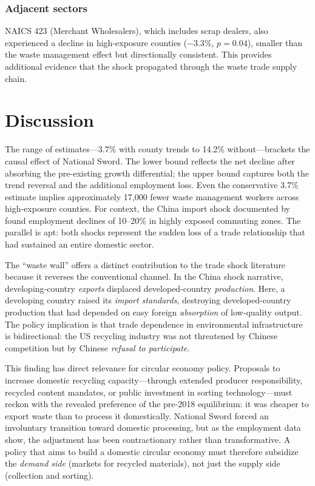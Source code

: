 \documentclass[12pt]{article}
\begin{document}
\subsubsection*{Adjacent sectors} NAICS 423 (Merchant Wholesalers), which includes scrap dealers, also experienced a decline in high-exposure counties ($-3.3\%$, $p = 0.04$), smaller than the waste management effect but directionally consistent. This provides additional evidence that the shock propagated through the waste trade supply chain.

\section{Discussion}

The range of estimates---3.7\% with county trends to 14.2\% without---brackets the causal effect of National Sword. The lower bound reflects the net decline after absorbing the pre-existing growth differential; the upper bound captures both the trend reversal and the additional employment loss. Even the conservative 3.7\% estimate implies approximately 17,000 fewer waste management workers across high-exposure counties. For context, the China import shock documented by \citet{Autor2013} found employment declines of 10--20\% in highly exposed commuting zones. The parallel is apt: both shocks represent the sudden loss of a trade relationship that had sustained an entire domestic sector.

The ``waste wall'' offers a distinct contribution to the trade shock literature because it reverses the conventional channel. In the China shock narrative, developing-country \textit{exports} displaced developed-country \textit{production}. Here, a developing country raised its \textit{import standards}, destroying developed-country production that had depended on easy foreign \textit{absorption} of low-quality output. The policy implication is that trade dependence in environmental infrastructure is bidirectional: the US recycling industry was not threatened by Chinese competition but by Chinese \textit{refusal to participate}.

This finding has direct relevance for circular economy policy. Proposals to increase domestic recycling capacity---through extended producer responsibility, recycled content mandates, or public investment in sorting technology---must reckon with the revealed preference of the pre-2018 equilibrium: it was cheaper to export waste than to process it domestically. National Sword forced an involuntary transition toward domestic processing, but as the employment data show, the adjustment has been contractionary rather than transformative. A policy that aims to build a domestic circular economy must therefore subsidize the \textit{demand side} (markets for recycled materials), not just the supply side (collection and sorting).
\end{document}
